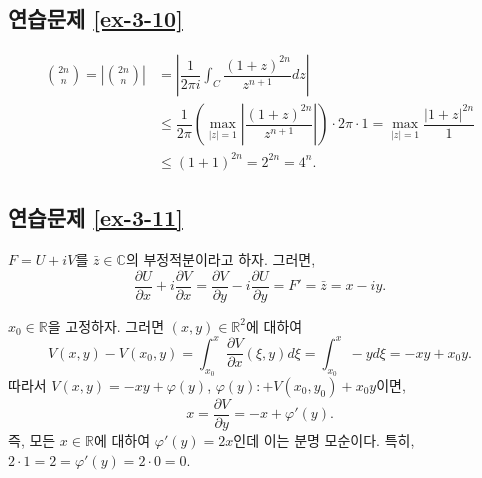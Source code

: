 \subsection*{연습문제 \ref{ex-3-10}}

\begin{align*}
{2n \choose n} = \left|  {2n \choose n} \right|
&= \left| \dfrac1{2\pi i}\int_C \dfrac{(1+z)^{2n}}{z^{n+1}}dz \right| \\
&\le \dfrac1{2\pi} \left( \max_{|z|=1} \left| \dfrac{(1+z)^{2n}}{z^{n+1}}\right| \right)
\cdot 2\pi\cdot 1 = \max_{|z|=1} \dfrac{|1+z|^{2n}}1 \\
&\le (1+1)^{2n} = 2^{2n} = 4^n.
\end{align*}

\subsection*{연습문제 \ref{ex-3-11}}

$F=U+iV$를 $\bar z \in \mathbb C$의 부정적분이라고 하자.
그러면,
\[
\dfrac{\partial U}{\partial x}  + i \dfrac{\partial V}{\partial x}
= \dfrac{\partial V}{\partial y} - i\dfrac{\partial U}{\partial y}
= F' = \bar z = x-iy.
\]

$x_0\in\mathbb R$을 고정하자. 그러면 $(x,y)\in\mathbb R^2$에 대하여
\[
V(x,y ) - V(x_0, y) = \int_{x_0}^x \dfrac{\partial V}{\partial x}(\xi, y )d\xi
= \int_{x_0}^x -y d\xi = -xy +x_0y.
\]
따라서 $V(x,y) = -xy + \varphi(y)$, $\varphi(y):+V(x_0,y_0) + x_0y$이면,
\[
x  = \dfrac{\partial V}{\partial y} = -x + \varphi'(y).
\]
즉, 모든 $x\in\mathbb R$에 대하여 $\varphi'(y) = 2x$인데
이는 분명 모순이다.
특히, $2\cdot 1 = 2 = \varphi'(y) = 2\cdot  0 = 0$.








%


